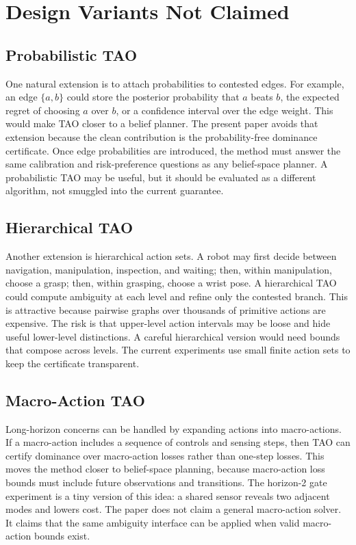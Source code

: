 \documentclass{article}
\begin{document}
\section{Design Variants Not Claimed}

\subsection{Probabilistic TAO}

One natural extension is to attach probabilities to contested edges. For example, an edge $\{a,b\}$ could store the posterior probability that $a$ beats $b$, the expected regret of choosing $a$ over $b$, or a confidence interval over the edge weight. This would make TAO closer to a belief planner. The present paper avoids that extension because the clean contribution is the probability-free dominance certificate. Once edge probabilities are introduced, the method must answer the same calibration and risk-preference questions as any belief-space planner. A probabilistic TAO may be useful, but it should be evaluated as a different algorithm, not smuggled into the current guarantee.

\subsection{Hierarchical TAO}

Another extension is hierarchical action sets. A robot may first decide between navigation, manipulation, inspection, and waiting; then, within manipulation, choose a grasp; then, within grasping, choose a wrist pose. A hierarchical TAO could compute ambiguity at each level and refine only the contested branch. This is attractive because pairwise graphs over thousands of primitive actions are expensive. The risk is that upper-level action intervals may be loose and hide useful lower-level distinctions. A careful hierarchical version would need bounds that compose across levels. The current experiments use small finite action sets to keep the certificate transparent.

\subsection{Macro-Action TAO}

Long-horizon concerns can be handled by expanding actions into macro-actions. If a macro-action includes a sequence of controls and sensing steps, then TAO can certify dominance over macro-action losses rather than one-step losses. This moves the method closer to belief-space planning, because macro-action loss bounds must include future observations and transitions. The horizon-2 gate experiment is a tiny version of this idea: a shared sensor reveals two adjacent modes and lowers cost. The paper does not claim a general macro-action solver. It claims that the same ambiguity interface can be applied when valid macro-action bounds exist.
\end{document}
